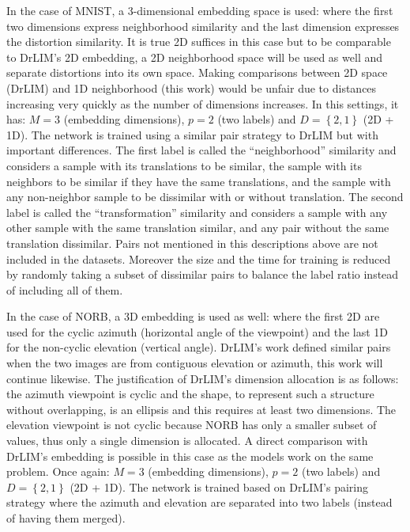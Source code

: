 \documentclass[a4paper,12pt]{report}
\begin{document}
In the case of MNIST, a 3-dimensional embedding space is used: where the first two dimensions express neighborhood similarity and the last dimension expresses the distortion similarity.
It is true 2D suffices in this case but to be comparable to DrLIM's 2D embedding, a 2D neighborhood space will be used as well and separate distortions into its own space.
Making comparisons between 2D space (DrLIM) and 1D neighborhood (this work) would be unfair due to distances increasing very quickly as the number of dimensions increases.
In this settings, it has: $M=3$ (embedding dimensions), $p = 2$ (two labels) and $D = \left\{ 2, 1 \right\}$ (2D + 1D).
The network is trained using a similar pair strategy to DrLIM but with important differences.
The first label is called the ``neighborhood'' similarity and considers a sample with its translations to be similar, the sample with its neighbors to be similar if they have the same translations, and the sample with any non-neighbor sample to be dissimilar with or without translation.
The second label is called the ``transformation'' similarity and considers a sample with any other sample with the same translation similar, and any pair without the same translation dissimilar.
Pairs not mentioned in this descriptions above are not included in the datasets.
Moreover the size and the time for training is reduced by randomly taking a subset of dissimilar pairs to balance the label ratio instead of including all of them.

In the case of NORB, a 3D embedding is used as well: where the first 2D are used for the cyclic azimuth (horizontal angle of the viewpoint) and the last 1D for the non-cyclic elevation (vertical angle).
DrLIM's work defined similar pairs when the two images are from contiguous elevation or azimuth, this work will continue likewise.
The justification of DrLIM's dimension allocation is as follows: the azimuth viewpoint is cyclic and the shape, to represent such a structure without overlapping, is an ellipsis and this requires at least two dimensions.
The elevation viewpoint is not cyclic because NORB has only a smaller subset of values, thus only a single dimension is allocated.
A direct comparison with DrLIM's embedding is possible in this case as the models work on the same problem.
Once again: $M=3$ (embedding dimensions), $p = 2$ (two labels) and $D = \left\{ 2, 1 \right\}$ (2D + 1D).
The network is trained based on DrLIM's pairing strategy where the azimuth and elevation are separated into two labels (instead of having them merged).
\end{document}

